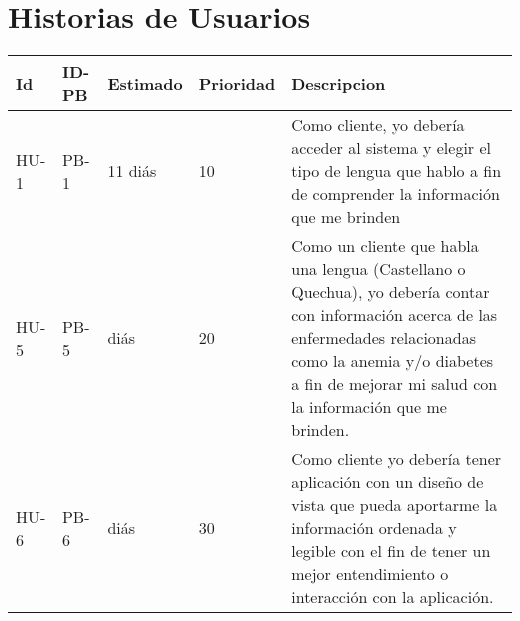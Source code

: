 \chapter{Historias de Usuarios}
\begin{table}[htbp]
	\begin{center}
		\begin{tabular}{| p{1.8cm}| p{1.8cm}| p{1.8cm}|p{1.8cm} |p{7.8cm} |}
			\hline
		\textbf{Id} & \textbf{ID-PB} & \textbf {Estimado}& \textbf{Prioridad} & \textbf{Descripcion}
		\\\hline  
 		HU-1&PB-1&11 diás& 10&Como cliente, yo debería acceder al sistema y elegir el tipo de lengua que hablo a fin de comprender la información que me brinden
 \\ \hline
	 	HU-5&PB-5&diás& 20&Como un cliente que habla una lengua (Castellano o Quechua), yo debería contar con información acerca de las enfermedades relacionadas como la anemia y/o diabetes a fin de mejorar mi salud con la información que me brinden. 
 \\ \hline
 		HU-6&PB-6&diás&30&Como cliente yo debería tener aplicación con un diseño de vista que pueda aportarme la información ordenada y legible con el fin de tener un mejor entendimiento o interacción con la aplicación.
  \\ \hline
		\end{tabular}
\end{center}
\end{table}